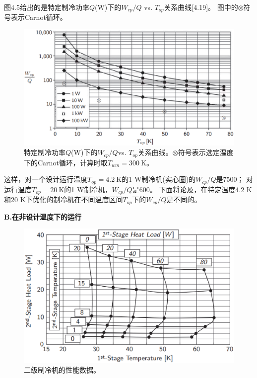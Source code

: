 图4.5给出的是特定制冷功率$Q$($\mathrm{W}$)下的$W_{cp}/Q$ vs. $T_{op}$关系曲线[4.19]。
图中的$\otimes$符号表示Carnot循环。
\begin{figure}[htbp]
	\centering
	\includegraphics[scale=0.4]{chpt4/figs/fig4.5.eps}
	\caption{特定制冷功率$Q$($\mathrm{W}$)下的$W_{cp}/Q$vs. $T_{op}$关系曲线。$\otimes$符号表示选定温度下的Carnot循环，计算时取$T_{wm}=300\ \mathrm{K}$。}
\end{figure}

这样，对一个设计运行温度$T_{op}=4.2\ \mathrm{K}$的1 W制冷机(实心圈)的$W_{cp}/Q$是7500；
对运行温度$T_{op}=20\ \mathrm{K}$的1 W制冷机，$W_{cp}/Q$是600。
下面将论及，在特定温度4.2 K和20 K下优化的制冷机在不同温度区间$T_{op}$下的$W_{cp}/Q$是不同的。

\textbf{B.在非设计温度下的运行}

\begin{figure}[htbp]
	\centering
	\includegraphics[scale=0.5]{chpt4/figs/fig4.6.eps}
	\caption{二级制冷机的性能数据。}
\end{figure}

